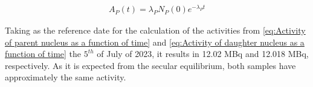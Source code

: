 \begin{align}
\label{eq:Activity of parent nucleus as a function of time}
    {A_{P}(t) = \lambda_{P} N_{P} (0) e^{-\lambda_{P} t}} 
\end{align}

Taking as the reference date for the calculation of the activities from \ref{eq:Activity of parent nucleus as a function of time} and \ref{eq:Activity of daughter nucleus as a function of time} the $5^{th}$ of July of 2023, it results in 12.02 \unit{\mega\becquerel} and 12.018 \unit{\mega\becquerel}, respectively. As it is expected from the secular equilibrium, both samples have approximately the same activity.